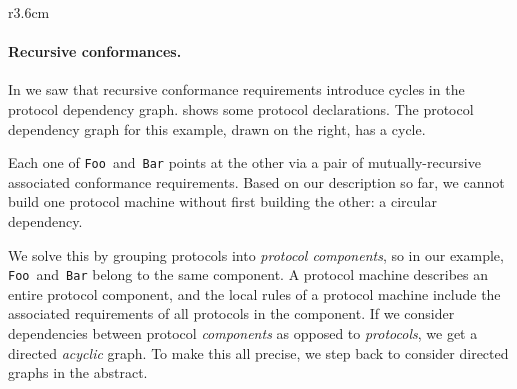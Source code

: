 \documentclass[../generics]{subfiles}
\begin{document}
\begin{wrapfigure}[12]{r}{3.6cm}
\end{wrapfigure}

\paragraph{Recursive conformances.}
In  we saw that recursive conformance requirements introduce cycles in the protocol dependency graph.  shows some protocol declarations. The protocol dependency graph for this example, drawn on the right, has a cycle.

Each one of \texttt{Foo}~and~\texttt{Bar} points at the other via a pair of mutually-recursive associated conformance requirements. Based on our description so far, we cannot build one protocol machine without first building the other: a circular dependency.

We solve this by grouping protocols into \emph{protocol components}, so in our example, \texttt{Foo}~and~\texttt{Bar} belong to the same component. A protocol machine describes an entire protocol component, and the local rules of a protocol machine include the associated requirements of all protocols in the component. If we consider dependencies between protocol \emph{components} as opposed to \emph{protocols}, we get a directed \emph{acyclic} graph. To make this all precise, we step back to consider directed graphs in the abstract.
\end{document}
